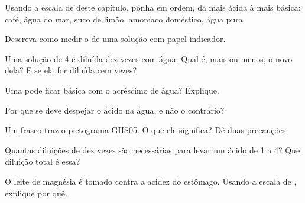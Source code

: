 \begin{exercise}[$\star$]\label{exo:g9:acids-bases-ph:3}
Usando a escala de  deste capítulo, ponha em ordem, da mais ácida à
mais básica: café, água do mar, suco de limão, amoníaco doméstico, água
pura.
\end{exercise}

\begin{exercise}[$\star$]\label{exo:g9:acids-bases-ph:4}
Descreva como medir o  de uma solução com papel indicador.
\end{exercise}

\begin{exercise}[$\star\star$]\label{exo:g9:acids-bases-ph:5}
Uma solução de  4 é diluída dez vezes com água. Qual é, mais ou menos,
o novo  dela? E se ela for diluída cem vezes?
\end{exercise}

\begin{exercise}[$\star\star$]\label{exo:g9:acids-bases-ph:6}
Uma  pode ficar básica com o acréscimo de água? Explique.
\end{exercise}

\begin{exercise}[$\star\star$]\label{exo:g9:acids-bases-ph:7}
Por que se deve despejar o ácido na água, e não o contrário?
\end{exercise}

\begin{exercise}[$\star\star$]\label{exo:g9:acids-bases-ph:8}
Um frasco traz o pictograma GHS05. O que ele significa? Dê duas
precauções.
\end{exercise}

\begin{exercise}[$\star\star$]\label{exo:g9:acids-bases-ph:9}
Quantas diluições de dez vezes são necessárias para levar um ácido de
 1 a  4? Que diluição total é essa?
\end{exercise}

\begin{exercise}[$\star\star$]\label{exo:g9:acids-bases-ph:10}
O leite de magnésia é tomado contra a acidez do estômago. Usando a
escala de , explique por quê.
\end{exercise}

